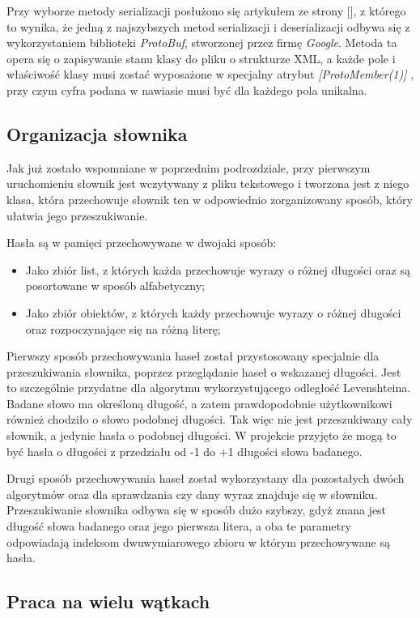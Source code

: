 Przy wyborze metody serializacji posłużono się artykułem ze strony [], z którego to wynika, że jedną z najszybszych metod serializacji i deserializacji odbywa się z wykorzystaniem biblioteki \textit{ProtoBuf}, stworzonej przez firmę \textit{Google}. Metoda ta opera się o zapisywanie stanu klasy do pliku o strukturze XML, a każde pole i właściwość klasy musi zostać wyposażone w specjalny atrybut \textit{[ProtoMember(1)]} , przy czym cyfra podana w nawiasie musi być dla każdego pola unikalna.

\subsection{Organizacja słownika}

Jak już zostało wspomniane w poprzednim podrozdziale, przy pierwszym uruchomieniu słownik jest wczytywany z pliku tekstowego i tworzona jest z niego klasa, która przechowuje słownik ten w odpowiednio zorganizowany sposób, który ułatwia jego przeszukiwanie. 

Hasła są w pamięci przechowywane w dwojaki sposób:
\begin{itemize}
	\item Jako zbiór list, z których każda przechowuje wyrazy o różnej długości oraz są posortowane w sposób alfabetyczny;
	\item Jako zbiór obiektów, z których każdy przechowuje wyrazy o różnej długości oraz rozpoczynające się na różną literę;
\end{itemize}

Pierwszy sposób przechowywania haseł został przystosowany specjalnie dla przeszukiwania słownika, poprzez przeglądanie haseł o wskazanej długości. Jest to szczególnie przydatne dla algorytmu wykorzystującego odległość Levenshteina. Badane słowo ma określoną długość, a zatem prawdopodobnie użytkownikowi również chodziło o słowo podobnej długości. Tak więc nie jest przeszukiwany cały słownik, a jedynie hasła o podobnej długości. W projekcie przyjęto że mogą to być hasła o długości z przedziału od -1 do +1 długości słowa badanego.

Drugi sposób przechowywania haseł został wykorzystany dla pozostałych dwóch algorytmów oraz dla sprawdzania czy dany wyraz znajduje się w słowniku. Przeszukiwanie słownika odbywa się w sposób dużo szybszy, gdyż znana jest długość słowa badanego oraz jego pierwsza litera, a oba te parametry odpowiadają indeksom dwuwymiarowego zbioru w którym przechowywane są hasła.

\subsection{Praca na wielu wątkach}

